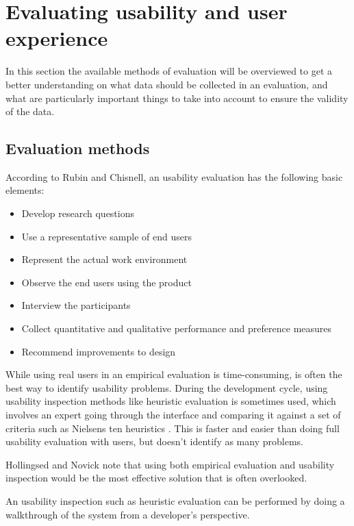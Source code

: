 \cite{albert2013measuring, rubin2008handbook}

\section{Evaluating usability and user experience}
In this section the available methods of evaluation will be overviewed to get a better understanding on what data should be collected in an evaluation, and what are particularly important things to take into account to ensure the validity of the data.

\subsection{Evaluation methods}
According to Rubin and Chisnell, an usability evaluation has the following basic elements:
\begin{itemize}
\item Develop research questions
\item Use a representative sample of end users
\item Represent the actual work environment
\item Observe the end users using the product
\item Interview the participants
\item Collect quantitative and qualitative performance and preference measures
\item Recommend improvements to design
\end{itemize}

\cite{rubin2008handbook}

While using real users in an empirical evaluation is time-consuming, is often the best way to identify usability problems. During the development cycle, using usability inspection methods like heuristic evaluation is sometimes used, which involves an expert going through the interface and comparing it against a set of criteria such as Nielsens ten heuristics \cite{Solr-oula.410573, nielsen1995usability}. This is faster and easier than doing full usability evaluation with users, but doesn't identify as many problems.

Hollingsed and Novick note that using both empirical evaluation and usability inspection would be the most effective solution that is often overlooked. \cite{hollingsed2007usability}

An usability inspection such as heuristic evaluation can be performed by doing a walkthrough of the system from a developer's perspective.

